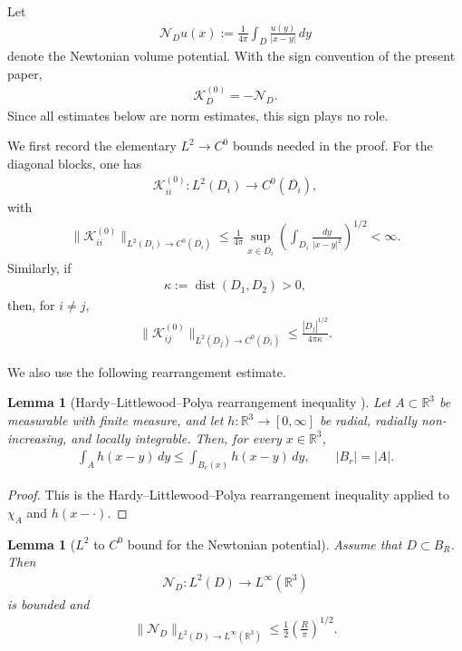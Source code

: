 \documentclass[10pt]{article}
\numberwithin{equation}{section}
\newtheorem{lemma}[theorem]{Lemma}
\begin{document}
Let
\begin{align*}
    \mathcal N_D u(x):=\frac{1}{4\pi}\int_D \frac{u(y)}{|x-y|}\,dy
\end{align*}
denote the Newtonian volume potential. With the sign convention of the present paper,
\begin{align*}
    \mathcal{K}_D^{(0)}=-\mathcal N_D.
\end{align*}
Since all estimates below are norm estimates, this sign plays no role.

We first record the elementary $L^2\to C^0$ bounds needed in the proof. For the diagonal blocks, one has
\begin{align*}
    \mathcal{K}_{ii}^{(0)}:L^2(D_i)\to C^0(\overline{D_i}),
\end{align*}
with
\begin{align*}
    \|\mathcal{K}_{ii}^{(0)}\|_{L^2(D_i)\to C^0(\overline{D_i})}
    \leq
    \frac{1}{4\pi}
    \sup_{x\in\overline{D_i}}
    \left(
        \int_{D_i}\frac{dy}{|x-y|^2}
    \right)^{1/2}
    <\infty.
\end{align*}
Similarly, if
\begin{align*}
    \kappa:=\operatorname{dist}(D_1,D_2)>0,
\end{align*}
then, for $i\neq j$,
\begin{align*}
    \|\mathcal{K}_{ij}^{(0)}\|_{L^2(D_j)\to C^0(\overline{D_i})}
    \leq
    \frac{|D_j|^{1/2}}{4\pi\kappa}.
\end{align*}

We also use the following rearrangement estimate.

\begin{lemma}[Hardy--Littlewood--Polya rearrangement inequality \cite{HardyLittlewoodPolya}]
Let $A\subset\mathbb R^3$ be measurable with finite measure, and let
$h:\mathbb R^3\to[0,\infty]$ be radial, radially non-increasing, and locally integrable. Then, for every $x\in\mathbb R^3$,
\begin{align*}
    \int_A h(x-y)\,dy
    \leq
    \int_{B_r(x)} h(x-y)\,dy,
    \qquad
    |B_r|=|A|.
\end{align*}
\end{lemma}

\begin{proof}
This is the Hardy--Littlewood--Polya rearrangement inequality applied to
$\chi_A$ and $h(x-\cdot)$.
\end{proof}

\begin{lemma}[$L^2$ to $C^0$ bound for the Newtonian potential]
Assume that $D\subset B_R$. Then
\begin{align*}
    \mathcal N_D:L^2(D)\to L^\infty(\mathbb R^3)
\end{align*}
is bounded and
\begin{align*}
    \|\mathcal N_D\|_{L^2(D)\to L^\infty(\mathbb R^3)}
    \leq
    \frac12\left(\frac{R}{\pi}\right)^{1/2}.
\end{align*}
\end{lemma}
\end{document}
